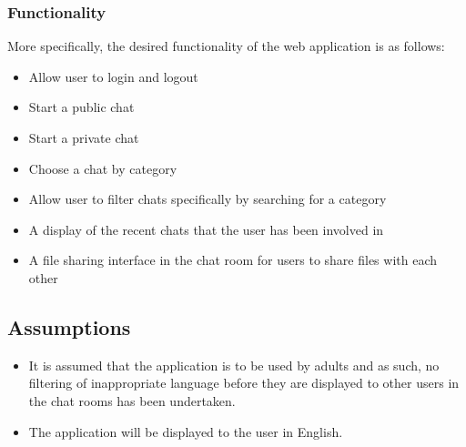 \documentclass{sig-alt-release2}
\begin{document}
\subsubsection{Functionality}
\label{sec: functionality}
More specifically, the desired functionality of the web application is as follows:
\begin{itemize}
\item Allow user to login and logout
\item Start a public chat
\item Start a private chat
\item Choose a chat by category
\item Allow user to filter chats specifically by searching for a category
\item A display of the recent chats that the user has been involved in
\item A file sharing interface in the chat room for users to share files with each other
\end{itemize}
\subsection{Assumptions}
\label{sec: assumptions} 
\begin{itemize} 
\item It is assumed that the application is to be used by adults and as such, no filtering of inappropriate language before they are displayed to other users in the chat rooms has been undertaken.
\item The application will be displayed to the user in English.
\end{itemize}

\end{document}
